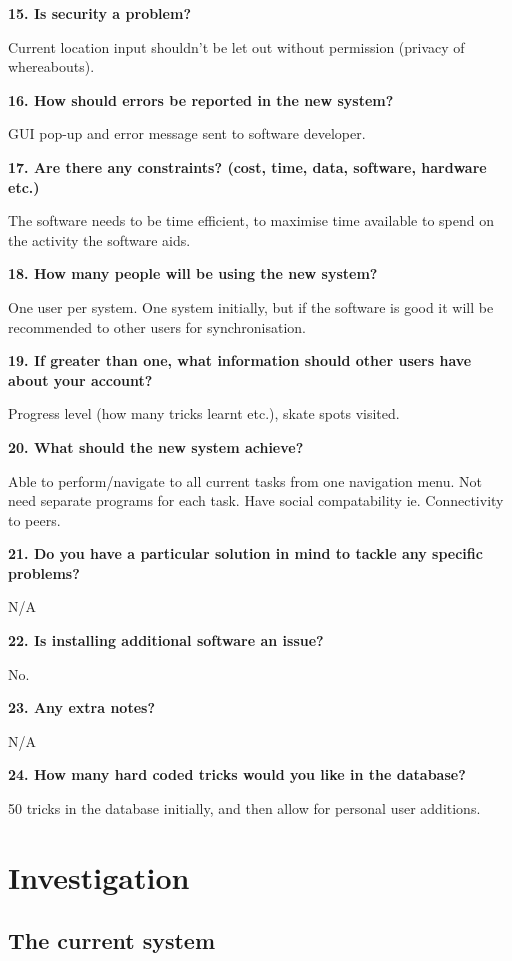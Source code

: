 \textbf{15. Is security a problem?}

Current location input shouldn't be let out without permission (privacy of whereabouts).

\textbf{16. How should errors be reported in the new system?}

GUI pop-up and error message sent to software developer.

\textbf{17. Are there any constraints? (cost, time, data, software, hardware etc.) }

The software needs to be time efficient, to maximise time available to spend on the activity the software aids.

\textbf{18. How many people will be using the new system?}

One user per system. One system initially, but if the software is good it will be recommended to other users for synchronisation.

\textbf{19. If greater than one, what information should other users have about your account?}

Progress level (how many tricks learnt etc.), skate spots visited.

\textbf{20. What should the new system achieve?}

Able to perform/navigate to all current tasks from one navigation menu.
Not need separate programs for each task.
Have social compatability ie. Connectivity to peers.

\textbf{21. Do you have a particular solution in mind to tackle any specific problems? }

N/A

\textbf{22. Is installing additional software an issue?}

No.

\textbf{23. Any extra notes? }

N/A

\textbf{24. How many hard coded tricks would you like in the database? }

50 tricks in the database initially, and then allow for personal user additions.


\section{Investigation}

\subsection{The current system}

